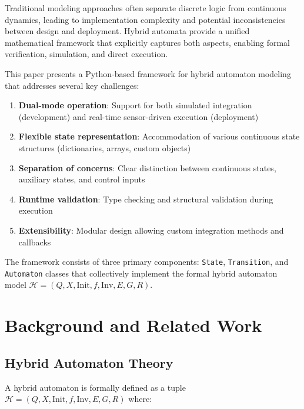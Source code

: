 \documentclass[conference]{IEEEtran}
\begin{document}
Traditional modeling approaches often separate discrete logic from continuous dynamics, leading to implementation complexity and potential inconsistencies between design and deployment. Hybrid automata provide a unified mathematical framework that explicitly captures both aspects, enabling formal verification, simulation, and direct execution.

This paper presents a Python-based framework for hybrid automaton modeling that addresses several key challenges:

\begin{enumerate}
\item \textbf{Dual-mode operation}: Support for both simulated integration (development) and real-time sensor-driven execution (deployment)
\item \textbf{Flexible state representation}: Accommodation of various continuous state structures (dictionaries, arrays, custom objects)
\item \textbf{Separation of concerns}: Clear distinction between continuous states, auxiliary states, and control inputs
\item \textbf{Runtime validation}: Type checking and structural validation during execution
\item \textbf{Extensibility}: Modular design allowing custom integration methods and callbacks
\end{enumerate}

The framework consists of three primary components: \texttt{State}, \texttt{Transition}, and \texttt{Automaton} classes that collectively implement the formal hybrid automaton model $\mathcal{H} = (Q, X, \text{Init}, f, \text{Inv}, E, G, R)$.

\section{Background and Related Work}

\subsection{Hybrid Automaton Theory}

A hybrid automaton is formally defined as a tuple $\mathcal{H} = (Q, X, \text{Init}, f, \text{Inv}, E, G, R)$ where:
\end{document}
